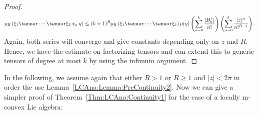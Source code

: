 \begin{proof}
\begin{equation*}
        p_R \left(
            \xi_1
            \tensor \cdots \tensor \xi_k
            \ostar_z
            \eta
        \right)
        \leq
        (k + 1)^R
		p_R \left(
         	\xi_1 \tensor \cdots \tensor \xi_k
        \right)
        p(\eta)
        \left(
            \sum\limits_{n=0}^k
            \frac{|B_n^*|}{n!}
        \right)
        \left(
            \sum\limits_{n=0}^k
            \frac{|z|^n}{n!^{R - 1}}
        \right).
    \end{equation*}
    Again, both series will converge and give constants depending only
    on $z$ and $R$. Hence, we have the estimate on factorizing tensors
    and can extend this to generic tensors of degree at most $k$ by using
    the infimum argument.
\end{proof}

In the following, we assume again that either $R > 1$ or $R \geq 1$
and $|z| < 2\pi$ in order the use
Lemma~\ref{LCAna:Lemma:PreContinuity2}. Now we can give a simpler proof of 
Theorem~\ref{Thm:LCAna:Continuity1} for the case of a locally m-convex 
Lie algebra:
